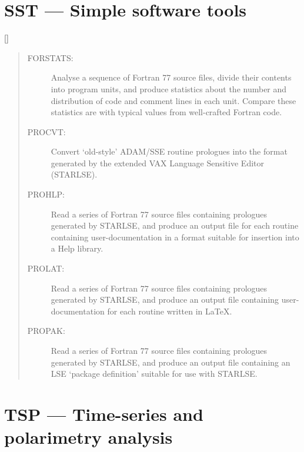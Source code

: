 \newpage

\section{SST --- Simple software tools}

\vspace{-10mm}

\hfill []

\vspace{2mm}

\begin{quote}
\begin{description}
\item [FORSTATS:]  Analyse a sequence of Fortran 77 source files, divide
 their contents into program units, and produce statistics about the number
 and distribution of code and comment lines in each unit.
 Compare these statistics are with typical values from well-crafted Fortran
 code.

\item [PROCVT:]  Convert `old-style' ADAM/SSE routine prologues into the
 format generated by the extended VAX Language Sensitive Editor (STARLSE).

\item [PROHLP:]  Read a series of Fortran 77 source files containing
 prologues generated by STARLSE, and produce an output file for each routine
 containing user-documentation in a format suitable for insertion into
 a Help library.

\item [PROLAT:]  Read a series of Fortran 77 source files containing
 prologues generated by STARLSE, and produce an output file containing
 user-documentation for each routine written in \LaTeX.

\item [PROPAK:]  Read a series of Fortran 77 source files containing
 prologues generated by STARLSE, and produce an output file containing
 an LSE `package definition' suitable for use with STARLSE.

\end{description}
\end{quote}

\newpage

\section{TSP --- Time-series and polarimetry analysis}

